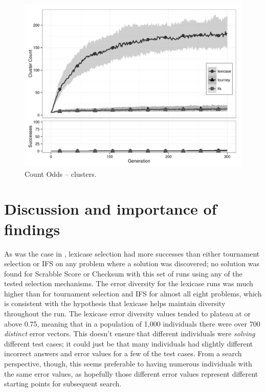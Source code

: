 \begin{figure}[p] %
\centering
\includegraphics[width=11.5cm]{count-odds-cluster.pdf}
\caption{Count Odds -- clusters.}
\label{count-oddsClu}
\end{figure}


\section{Discussion and importance of findings}
\label{sec:discussion}

As was the case in \cite{Helmuth:2015:GECCO}, lexicase selection had more successes than 
either tournament selection or IFS on any problem where a solution was discovered; no solution
was found for Scrabble Score or Checksum with this set of runs using any of the tested 
selection mechanisms. The error diversity for the lexicase runs was much higher than for tournament
selection and IFS for almost all eight problems, which is consistent with the hypothesis that
lexicase helps maintain diversity throughout the run. The lexicase error diversity values tended to
plateau at or above 0.75, meaning that in a population of 1,000 individuals there were over 700
\emph{distinct} error vectors. This doesn't ensure that different individuals were \emph{solving}
different test cases; it could just be that many individuals had slightly different incorrect
answers and error values for a few of the test cases. From a search perspective, though, this seems
preferable to having numerous individuals with the same error values, as hopefully those different
error values represent different starting points for subsequent search.

